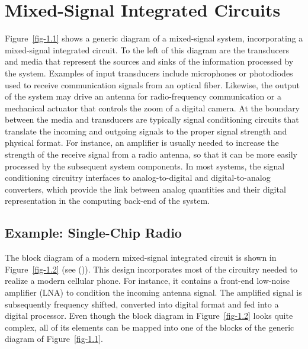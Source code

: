 \documentclass[
  11pt,
  letterpaper,
  abstract]{scrbook}
\begin{document}
\section{Mixed-Signal Integrated
Circuits}\label{mixed-signal-integrated-circuits}

Figure~\ref{fig-1.1} shows a generic diagram of a mixed-signal system,
incorporating a mixed-signal integrated circuit. To the left of this
diagram are the transducers and media that represent the sources and
sinks of the information processed by the system. Examples of input
transducers include microphones or photodiodes used to receive
communication signals from an optical fiber. Likewise, the output of the
system may drive an antenna for radio-frequency communication or a
mechanical actuator that controls the zoom of a digital camera. At the
boundary between the media and transducers are typically signal
conditioning circuits that translate the incoming and outgoing signals
to the proper signal strength and physical format. For instance, an
amplifier is usually needed to increase the strength of the receive
signal from a radio antenna, so that it can be more easily processed by
the subsequent system components. In most systems, the signal
conditioning circuitry interfaces to analog-to-digital and
digital-to-analog converters, which provide the link between analog
quantities and their digital representation in the computing back-end of
the system.

\subsection{Example: Single-Chip Radio}\label{example-single-chip-radio}

The block diagram of a modern mixed-signal integrated circuit is shown
in Figure~\ref{fig-1.2} (see
()). This
design incorporates most of the circuitry needed to realize a modern
cellular phone. For instance, it contains a front-end low-noise
amplifier (LNA) to condition the incoming antenna signal. The amplified
signal is subsequently frequency shifted, converted into digital format
and fed into a digital processor. Even though the block diagram in
Figure~\ref{fig-1.2} looks quite complex, all of its elements can be
mapped into one of the blocks of the generic diagram of
Figure~\ref{fig-1.1}.
\end{document}
